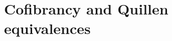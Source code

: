 \documentclass[a4paper,10pt
,draft
]{article}%
\numberwithin{equation}{section}
\numberwithin{figure}{section}
\theoremstyle{definition} %
\newtheorem{definition}[equation]{Definition}%
\newcommand{\sets}[2]{\left\{ #1 \;|\; #2\right\}}%
\newcommand{\Sym}{\ensuremath{\mathsf{Sym}}}%
\newcommand{\Op}{\mathsf{Op}}%
\newcommand{\F}{\ensuremath{\mathcal F}}
\newcommand{\V}{\ensuremath{\mathcal V}}
\renewcommand{\P}{\ensuremath{\mathcal P}}
\newcommand{\1}{\ensuremath{\mathbbm 1}}%
\begin{document}









\section{Cofibrancy and Quillen equivalences}\label{COFIB SEC}
\end{document}
